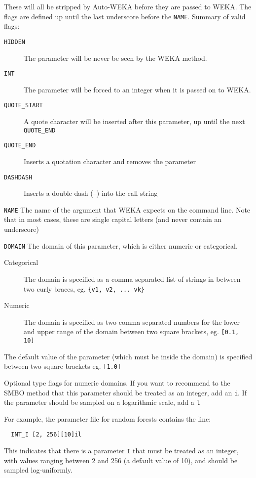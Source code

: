 \begin{description}
  \item[\texttt{FLAGS}] These will all be stripped by Auto-WEKA before they are passed to WEKA. The flags are defined up until the last underscore before the \texttt{NAME}. Summary of valid flags:
  \begin{description}
    \item[\texttt{HIDDEN}] The parameter will be never be seen by the WEKA method.
    \item[\texttt{INT}] The parameter will be forced to an integer when it is passed on to WEKA.
    \item[\texttt{QUOTE\_START}] A quote character will be inserted after this parameter, up until the next \texttt{QUOTE\_END}
    \item[\texttt{QUOTE\_END}] Inserts a quotation character and removes the parameter
    \item[\texttt{DASHDASH}] Inserts a double dash (\texttt{--}) into the call string
  \end{description}
  \item{\texttt{NAME}} The name of the argument that WEKA expects on the command line. Note that in most cases, these are single capital letters (and never contain an underscore)
  \item{\texttt{DOMAIN}} The domain of this parameter, which is either numeric or categorical.
  \begin{description}
    \item[Categorical] The domain is specified as a comma separated list of strings in between two curly braces, eg. \texttt{\{v1, v2, ... vk\}}
    \item[Numeric] The domain is specified as two comma separated numbers for the lower and upper range of the domain between two square brackets, eg. \texttt{[0.1, 10]}
  \end{description}
  \item[\texttt{DEFAULT}] The default value of the parameter (which must be inside the domain) is specified between two square brackets eg. \texttt{[1.0]}
  \item[\texttt{TYPEFLAGS}] Optional type flags for numeric domains. If you want to recommend to the SMBO method that this parameter should be treated as an integer, add an \texttt{i}. If the parameter should be sampled on a logarithmic scale, add a \texttt{l}
\end{description}

For example, the parameter file for random forests contains the line:
\begin{verbatim}
  INT_I [2, 256][10]il
\end{verbatim}
This indicates that there is a parameter \texttt{I} that must be treated as an integer, with values ranging between 2 and 256 (a default value of 10), and should be sampled log-uniformly.

